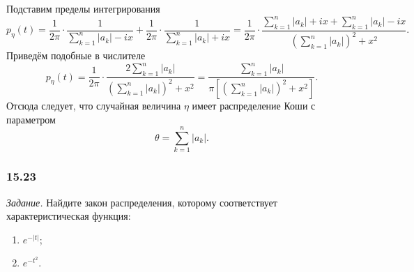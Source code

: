 Подставим пределы интегрирования
$$p_{ \eta } \left( t \right) =
  \frac{1}{2 \pi } \cdot
  \frac{1}{ \sum \limits_{k = 1}^n \left| a_k \right| - ix} +
  \frac{1}{2 \pi } \cdot \frac{1}{ \sum \limits_{k = 1}^n \left| a_k \right| + ix} =
  \frac{1}{2 \pi } \cdot
  \frac{ \sum \limits_{k = 1}^n \left| a_k \right| + ix +
  \sum \limits_{k = 1}^n \left| a_k \right| - ix}{ \left( \sum \limits_{k = 1}^n
  \left| a_k \right| \right)^2 + x^2}.$$
Приведём подобные в числителе
$$p_{ \eta } \left( t \right) =
  \frac{1}{2 \pi } \cdot
  \frac{2 \sum \limits_{k = 1}^n
    \left| a_k \right| }{\left( \sum \limits_{k = 1}^n \left| a_k \right| \right)^2 + x^2} =
  \frac{ \sum \limits_{k = 1}^n
    \left| a_k \right| }{ \pi \left[ \left( \sum \limits_{k = 1}^n \left| a_k \right| \right)^2 +
  x^2 \right] }.$$
Отсюда следует, что случайная величина $ \eta $ имеет распределение Коши с параметром
$$ \theta =
  \sum \limits_{k = 1}^n \left| a_k \right|.$$

\subsubsection*{15.23}

\textit{Задание.} Найдите закон распределения, которому соответствует характеристическая функция:
\begin{enumerate}[label=\alph*)]
\item $e^{- \left| t \right| }$;
\item $e^{- t^2}$.
\end{enumerate}

